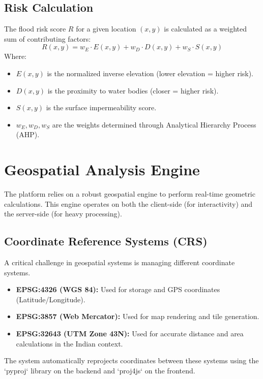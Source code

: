 \documentclass[12pt,a4paper]{report}
\begin{document}
\subsection{Risk Calculation}
The flood risk score $R$ for a given location $(x, y)$ is calculated as a weighted sum of contributing factors:
\begin{equation}
R(x,y) = w_E \cdot E(x,y) + w_D \cdot D(x,y) + w_S \cdot S(x,y)
\end{equation}
Where:
\begin{itemize}
    \item $E(x,y)$ is the normalized inverse elevation (lower elevation = higher risk).
    \item $D(x,y)$ is the proximity to water bodies (closer = higher risk).
    \item $S(x,y)$ is the surface impermeability score.
    \item $w_E, w_D, w_S$ are the weights determined through Analytical Hierarchy Process (AHP).
\end{itemize}

\section{Geospatial Analysis Engine}
The platform relies on a robust geospatial engine to perform real-time geometric calculations. This engine operates on both the client-side (for interactivity) and the server-side (for heavy processing).

\subsection{Coordinate Reference Systems (CRS)}
A critical challenge in geospatial systems is managing different coordinate systems.
\begin{itemize}
    \item \textbf{EPSG:4326 (WGS 84):} Used for storage and GPS coordinates (Latitude/Longitude).
    \item \textbf{EPSG:3857 (Web Mercator):} Used for map rendering and tile generation.
    \item \textbf{EPSG:32643 (UTM Zone 43N):} Used for accurate distance and area calculations in the Indian context.
\end{itemize}
The system automatically reprojects coordinates between these systems using the `pyproj` library on the backend and `proj4js` on the frontend.
\end{document}

